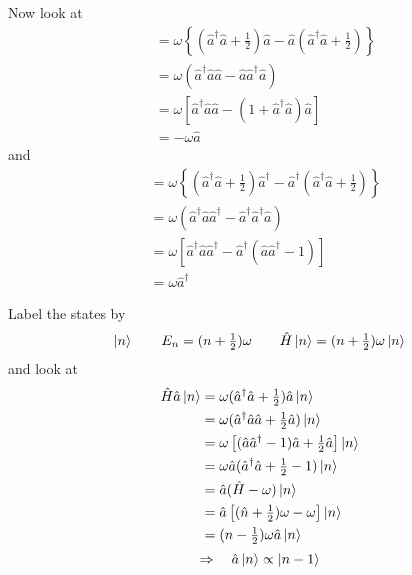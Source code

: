 \documentclass{article}
\begin{document}
\noindent Now look at
\begin{align}
[ \hat{H}, \hat{a} ] &= \omega \left\lbrace ( \hat{a}^\dagger \hat{a} + \tfrac{1}{2} ) \hat{a} - \hat{a} ( \hat{a}^\dagger \hat{a} + \tfrac{1}{2} ) \right\rbrace \nonumber\\
&= \omega ( \hat{a}^\dagger \hat{a} \hat{a} - \hat{a} \hat{a}^\dagger \hat{a} ) \nonumber\\
&= \omega [ \hat{a}^\dagger \hat{a} \hat{a} - ( 1 + \hat{a}^\dagger \hat{a} ) \hat{a} ] \nonumber\\
&= -\omega \hat{a}
\end{align}
and
\begin{align}
[ \hat{H}, \hat{a}^\dagger ] &= \omega \left\lbrace ( \hat{a}^\dagger \hat{a} + \tfrac{1}{2} ) \hat{a}^\dagger - \hat{a}^\dagger ( \hat{a}^\dagger \hat{a} + \tfrac{1}{2} ) \right\rbrace \nonumber\\
&= \omega ( \hat{a}^\dagger \hat{a} \hat{a}^\dagger - \hat{a}^\dagger \hat{a}^\dagger \hat{a} ) \nonumber\\
&= \omega [ \hat{a}^\dagger \hat{a} \hat{a}^\dagger - \hat{a}^\dagger ( \hat{a} \hat{a}^\dagger - 1 ) ] \nonumber\\
&= \omega \hat{a}^\dagger
\end{align}


\noindent Label the states by
\begin{equation}
\ket{n} \qquad E_n = ( n + \tfrac{1}{2} ) \omega \qquad \hat{H} \ket{n} = ( n + \tfrac{1}{2} ) \omega \ket{n}
\end{equation}
and look at
\begin{align}
\hat{H} \hat{a} \ket{n} &= \omega ( \hat{a}^\dagger \hat{a} + \tfrac{1}{2} ) \hat{a} \ket{n} \nonumber\\
&= \omega ( \hat{a}^\dagger \hat{a} \hat{a} + \tfrac{1}{2} \hat{a} ) \ket{n} \nonumber\\
&= \omega \left[ ( \hat{a} \hat{a}^\dagger - 1 ) \hat{a} + \tfrac{1}{2} \hat{a} \right] \ket{n} \nonumber\\
&= \omega \hat{a} ( \hat{a}^\dagger \hat{a} + \tfrac{1}{2} - 1 ) \ket{n} \nonumber\\
&= \hat{a} ( \hat{H} - \omega ) \ket{n} \nonumber\\
&= \hat{a} \left[ ( \hat{n} + \tfrac{1}{2} ) \omega - \omega \right] \ket{n} \nonumber\\
&= ( n - \tfrac{1}{2} ) \omega \hat{a} \ket{n}
\end{align}
\begin{equation}
\Rightarrow \quad \hat{a} \ket{n} \propto \ket{n-1}
\end{equation}
\end{document}
